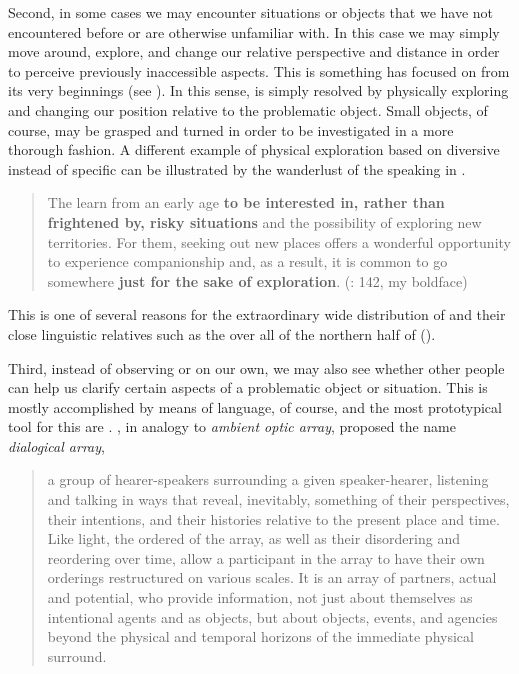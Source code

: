 Second, in some cases we may encounter situations or objects that we have not encountered before or are otherwise unfamiliar with. In this case we may simply move around, explore, and change our relative perspective and distance in order to perceive previously inaccessible aspects. This is something  has focused on from its very beginnings (see \citealt{Gibson1979}). In this sense,  is simply resolved by physically exploring and changing our position relative to the problematic object. Small objects, of course, may be grasped and turned in order to be investigated in a more thorough fashion. A different example of physical exploration based on diversive instead of specific  can be illustrated by the wanderlust of the  speaking  in .

\begin{quote}
The  learn from an early age \textbf{to be interested in, rather than frightened by, risky situations} and the possibility of exploring new territories. For them, seeking out new places offers a wonderful opportunity to experience companionship and, as a result, it is common to go somewhere \textbf{just for the sake of exploration}. (\citealt{SafonovaSántha2013}: 142, my boldface)
\end{quote}

\noindent This is one of several reasons for the extraordinary wide distribution of  and their close linguistic relatives such as the  over all of the northern half of  ().

Third, instead of observing or  on our own, we may also see whether other people can help us clarify certain aspects of a problematic object or situation. This is mostly accomplished by means of language, of course, and the most prototypical tool for this are . \citet[636]{Hodges2009}, in analogy to  \textit{ambient optic array}, proposed the name \textit{dialogical array},

\begin{quote}
a group of hearer-speakers surrounding a given speaker-hearer, listening and talking in ways that reveal, inevitably, something of their perspectives, their intentions, and their histories relative to the present place and time. Like light, the ordered  of the array, as well as their disordering and reordering over time, allow a participant in the array to have their own orderings restructured on various scales. It is an array of partners, actual and potential, who provide information, not just about themselves as intentional agents and as objects, but about objects, events, and agencies beyond the physical and temporal horizons of the immediate physical surround. \citep[636]{Hodges2009}
\end{quote}

